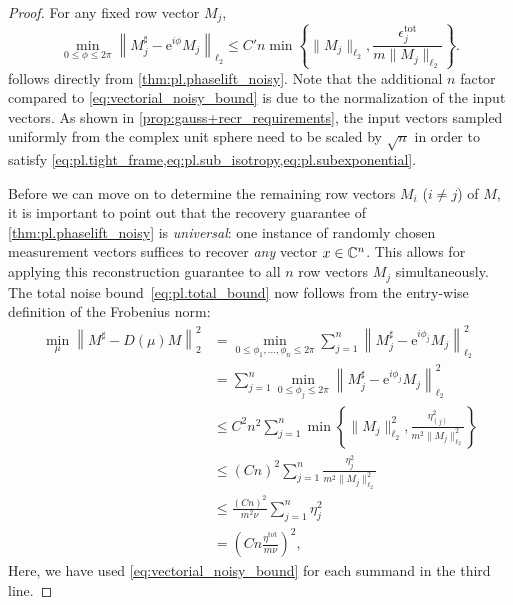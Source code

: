 \begin{proof}
For any fixed row vector ${M}_j$,
\[
  \min_{0 \leq \phi \leq 2 \pi}\left\| {M}_j^\sharp - \mathrm{e}^{i \phi} {M}_j \right\|_{\ell_2} \leq C' n \min
  \left\{
  \| {M}_j \|_{\ell_2}, \frac{ \epsilon_j^{\mathrm{tot}}}{m \| {M}_j \|_{\ell_2}}
  \right\}.
  \label{eq:noisy_reconstruction_vectorial_bound}
\]
follows directly from \cref{thm:pl.phaselift_noisy}.
Note that the additional $n$ factor compared to \cref{eq:vectorial_noisy_bound} is due to the normalization of the input vectors.
As shown in \cref{prop:gauss+recr_requirements}, the input vectors sampled uniformly from the complex unit sphere need to be scaled by $\sqrt{n}$ in order to satisfy \cref{eq:pl.tight_frame,eq:pl.sub_isotropy,eq:pl.subexponential}.

Before we can move on to determine the remaining row vectors ${M}_{i}$ ($i \neq j$) of ${M}$, it is important to point out that the recovery guarantee of \cref{thm:pl.phaselift_noisy} is \emph{universal}: one instance of randomly chosen measurement vectors suffices to recover \emph{any} vector ${x} \in {\mathbb{C}}^n$.
This allows for applying this reconstruction guarantee to all $n$ row vectors ${M}_j$ simultaneously.
The total noise bound~\eqref{eq:pl.total_bound} now follows from the entry-wise definition of the Frobenius norm:
\begin{align}
  \min_{{\mu}}\left\|  {M}^\sharp -  {D} ({\mu}) {M} \right\|_2 ^2
  &= \min_{0 \leq \phi_1,\ldots,\phi_n \leq 2 \pi}
  \sum_{j=1}^n \left\| {M}_j^\sharp - \mathrm{e}^{i \phi_j} {M}_j \right\|_{\ell_2}^2 \\
  &= \sum_{j=1}^n \min_{0 \leq \phi_j \leq 2 \pi} \left\| {M}_j^\sharp - \mathrm{e}^{i \phi_j} {M}_j \right\|_{\ell_2}^2 \\
  & \leq C^2 n^2 \sum_{j=1}^n  \min \left\{ \| {M}_j \|_{\ell_2}^2, \frac{ \eta_{(j)}^2}{m^2 \|{M}_j \|_{\ell_2}^2} \right\} \\
  &\leq \left(C n\right)^2 \sum_{j=1}^n \frac{\eta_{j}^2}{m^2 \|{M}_j \|_{\ell_2}^2} \\
  & \leq \frac{\left(Cn \right)^2}{m^2 \nu} \sum_{j=1}^n \eta_{j}^2 \\
  &= \left( C n \frac{\eta^{\mathrm{tot}}}{m \nu} \right)^2,
\end{align}
Here, we have used \eqref{eq:vectorial_noisy_bound} for each summand in the third line.
\end{proof}



